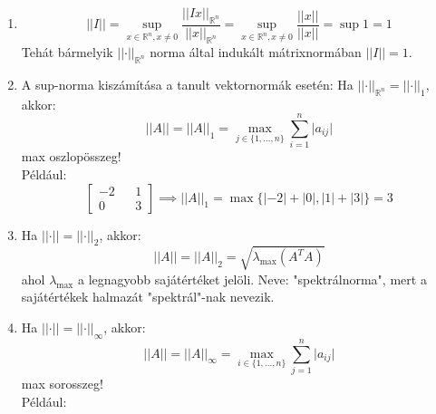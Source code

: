 \begin{pelda}
    \begin{enumerate}
        \item \begin{equation*}
            \lvert \lvert I \rvert \rvert = \sup_{x \in \mathbb{R}^{n}, x \neq 0} \frac{\lvert \lvert Ix \rvert  \rvert _{\mathbb{R}^{n}}}{\lvert \lvert x \rvert  \rvert _{\mathbb{R}^{n}}} = \sup_{x \in \mathbb{R}^{n}, x \neq 0} \frac{\lvert \lvert x \rvert  \rvert }{\lvert \lvert x \rvert  \rvert } = \sup 1 = 1
        \end{equation*}
        Tehát bármelyik $\lvert \lvert \cdot \rvert \rvert_{\mathbb{R}^{n}}$ norma által indukált mátrixnormában $\lvert \lvert I \rvert \rvert = 1$.

        \item A sup-norma kiszámítása a tanult vektornormák esetén:
            Ha $\lvert \lvert \cdot \rvert \rvert_{\mathbb{R}^{n}} = \lvert \lvert \cdot \rvert \rvert_{1}$, akkor:
            \begin{equation*}
                \lvert \lvert A \rvert  \rvert  = \lvert \lvert A \rvert  \rvert _{1} = \max_{j \in \{ 1, \dots, n \}} \sum_{i = 1} ^{n} \lvert a_{ij} \rvert 
            \end{equation*}
            max oszlopösszeg! \\
            Például:
            \begin{equation*}
                \begin{bmatrix}
                -2 && 1 \\
                0 && 3
                \end{bmatrix}
                \implies \lvert \lvert A \rvert  \rvert_{1} =  \max \{ \lvert -2 \rvert + \lvert 0 \rvert, \lvert 1 \rvert + \lvert 3 \rvert  \} = 3
            \end{equation*}

        \item Ha $\lvert \lvert \cdot \rvert \rvert = \lvert \lvert \cdot \rvert \rvert_{2}$, akkor:
        \begin{equation*}
            \lvert \lvert A \rvert \rvert = \lvert \lvert A \rvert \rvert_{2} = \sqrt{ \lambda_{\max} (A^{T}A) }
        \end{equation*}
        ahol $\lambda_{\max}$ a legnagyobb sajátértéket jelöli.
        Neve: "spektrálnorma", mert a sajátértékek halmazát "spektrál"-nak nevezik.

        \item Ha $\lvert \lvert \cdot \rvert \rvert = \lvert \lvert \cdot \rvert \rvert_{\infty}$, akkor:
        \begin{equation*}
            \lvert \lvert A \rvert \rvert = \lvert \lvert A \rvert \rvert_{\infty} = \max_{i \in \{ 1, \dots, n \}} \sum_{j=1}^{n} \lvert a_{ij} \rvert 
        \end{equation*}
        max sorosszeg!\\
        Például:
    

\end{enumerate}
\end{pelda}
